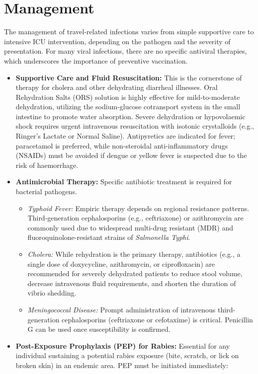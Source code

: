 \section*{Management}
The management of travel-related infections varies from simple supportive care to intensive ICU intervention, depending on the pathogen and the severity of presentation. For many viral infections, there are no specific antiviral therapies, which underscores the importance of preventive vaccination.
\begin{itemize}
    \item \textbf{Supportive Care and Fluid Resuscitation:} This is the cornerstone of therapy for cholera and other dehydrating diarrheal illnesses. Oral Rehydration Salts (ORS) solution is highly effective for mild-to-moderate dehydration, utilizing the sodium-glucose cotransport system in the small intestine to promote water absorption. Severe dehydration or hypovolaemic shock requires urgent intravenous resuscitation with isotonic crystalloids (e.g., Ringer's Lactate or Normal Saline). Antipyretics are indicated for fever; paracetamol is preferred, while non-steroidal anti-inflammatory drugs (NSAIDs) must be avoided if dengue or yellow fever is suspected due to the risk of haemorrhage.
    \item \textbf{Antimicrobial Therapy:} Specific antibiotic treatment is required for bacterial pathogens.
    \begin{itemize}
        \item \textit{Typhoid Fever:} Empiric therapy depends on regional resistance patterns. Third-generation cephalosporins (e.g., ceftriaxone) or azithromycin are commonly used due to widespread multi-drug resistant (MDR) and fluoroquinolone-resistant strains of \textit{Salmonella Typhi}.
        \item \textit{Cholera:} While rehydration is the primary therapy, antibiotics (e.g., a single dose of doxycycline, azithromycin, or ciprofloxacin) are recommended for severely dehydrated patients to reduce stool volume, decrease intravenous fluid requirements, and shorten the duration of vibrio shedding.
        \item \textit{Meningococcal Disease:} Prompt administration of intravenous third-generation cephalosporins (ceftriaxone or cefotaxime) is critical. Penicillin G can be used once susceptibility is confirmed.
    \end{itemize}
    \item \textbf{Post-Exposure Prophylaxis (PEP) for Rabies:} Essential for any individual sustaining a potential rabies exposure (bite, scratch, or lick on broken skin) in an endemic area. PEP must be initiated immediately:

\end{itemize}
